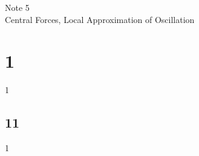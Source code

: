 \documentclass[12pt]{article}
\begin{document}
\normalfont
\pagestyle{pages}


\begin{center}
\vspace{3in}
{\Large Note 5 } \\[0.05in]
Central Forces, Local Approximation of Oscillation \\ [0.5in]
\end{center}


\section{1}
1

\subsection{11}

1
\end{document}

